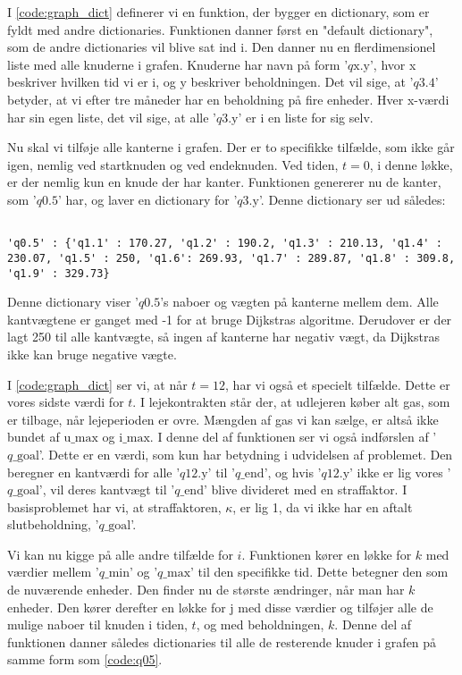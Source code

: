 I \autoref{code:graph_dict} definerer vi en funktion, der bygger en dictionary, som er fyldt med andre dictionaries. Funktionen danner først en "default dictionary", som de andre dictionaries vil blive sat ind i.
Den danner nu en flerdimensionel liste med alle knuderne i grafen. Knuderne har navn på form '$q\textrm{x.y}$', hvor x beskriver hvilken tid vi er i, og y beskriver beholdningen. Det vil sige, at '$q3.4$' betyder, at vi efter tre måneder har en beholdning på fire enheder. Hver x-værdi har sin egen liste, det vil sige, at alle '$q\textrm{3.y}$' er i en liste for sig selv.

Nu skal vi tilføje alle kanterne i grafen. Der er to specifikke tilfælde, som ikke går igen, nemlig ved startknuden og ved endeknuden. Ved tiden, $t=0$, i denne løkke, er der nemlig kun en knude der har kanter. Funktionen genererer nu de kanter, som '$q\textrm{0.5}$' har, og laver en dictionary for '$q\textrm{3.y}$'. 
Denne dictionary ser ud således:

\begin{lstlisting}[label=code:q05, caption=Dictionary for $q \textrm{0.5}$.]

'q0.5' : {'q1.1' : 170.27, 'q1.2' : 190.2, 'q1.3' : 210.13, 'q1.4' : 230.07, 'q1.5' : 250, 'q1.6': 269.93, 'q1.7' : 289.87, 'q1.8' : 309.8, 'q1.9' : 329.73}
\end{lstlisting}
Denne dictionary viser '$q0.5$'s naboer og vægten på kanterne mellem dem. Alle kantvægtene er ganget med -1 for at bruge Dijkstras algoritme. Derudover er der lagt 250 til alle kantvægte, så ingen af kanterne har negativ vægt, da Dijkstras ikke kan bruge negative vægte. 

I \autoref{code:graph_dict} ser vi, at når $t=12$, har vi også et specielt tilfælde. Dette er vores sidste værdi for $t$. I lejekontrakten står der, at udlejeren køber alt gas, som er tilbage, når lejeperioden er ovre. Mængden af gas vi kan sælge, er altså ikke bundet af $\textrm{u\_max}$ og $\textrm{i\_max}$. I denne del af funktionen ser vi også indførslen af '$q\textrm{\_goal}$'. Dette er en værdi, som kun har betydning i udvidelsen af problemet. Den beregner  en kantværdi for alle '$q\textrm{12.y}$' til '$q\textrm{\_end}$', og hvis '$q\textrm{12.y}$' ikke er lig vores '$q\textrm{\_goal}$', vil deres kantvægt til '$q\textrm{\_end}$' blive divideret med en straffaktor. I basisproblemet har vi, at straffaktoren, $\kappa$, er lig 1, da vi ikke har en aftalt slutbeholdning, '$q\textrm{\_goal}$'.

Vi kan nu kigge på alle andre tilfælde for $i$. Funktionen kører en løkke for $k$ med værdier mellem '$q\textrm{\_min}$' og '$q\textrm{\_max}$' til den specifikke tid. Dette betegner den som de nuværende enheder.
Den finder nu de største ændringer, når man har $k$ enheder. Den kører derefter en løkke for $\textrm{j}$ med disse værdier og tilføjer alle de mulige naboer til knuden i tiden, $t$, og med beholdningen, $k$. Denne del af funktionen danner således dictionaries til alle de resterende knuder i grafen på samme form som \autoref{code:q05}.

